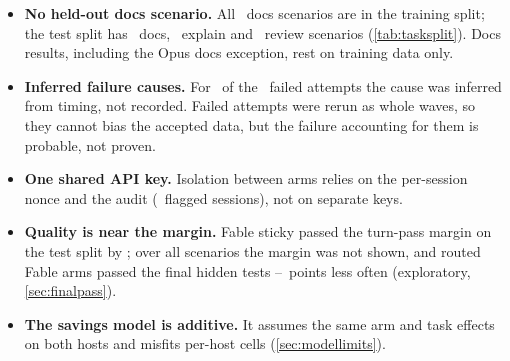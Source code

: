 \begin{itemize}
    task types, families); only the preregistered hypotheses carry a decision rule, and they rest on \NTest\
    test scenarios. Exploratory contrasts are not corrected for multiplicity.
  \item \textbf{No held-out docs scenario.} All \RvDocsTrain\ docs scenarios are in the training split; the test
    split has \RvDocsTest\ docs, \RvExplainTest\ explain and \RvReviewTest\ review scenarios (\cref{tab:tasksplit}).
    Docs results, including the Opus docs exception, rest on training data only.
  \item \textbf{Inferred failure causes.} For \NFailedInferred\ of the \NFailed\ failed attempts the cause
    was inferred from timing, not recorded. Failed attempts were rerun as whole waves, so they cannot bias
    the accepted data, but the failure accounting for them is probable, not proven.
  \item \textbf{One shared API key.} Isolation between arms relies on the per-session nonce and the audit
    (\AuditFlagged\ flagged sessions), not on separate keys.
  \item \textbf{Quality is near the margin.} Fable sticky passed the turn-pass margin on the test split by
    \QFableStickyMarginGap; over all scenarios the margin was not shown, and routed Fable arms passed the
    final hidden tests \FinalGapLow--\FinalGapHigh\ points less often (exploratory, \cref{sec:finalpass}).
  \item \textbf{The savings model is additive.} It assumes the same arm and task effects on both hosts and
    misfits per-host cells (\cref{sec:modellimits}).
\end{itemize}
